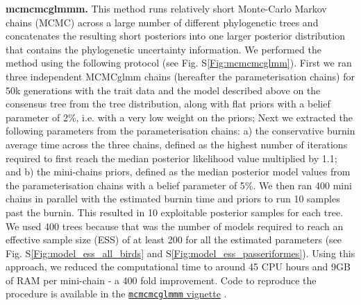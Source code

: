 \documentclass[12pt,letterpaper]{article}
\begin{document}
\textbf{mcmcmcglmmm.}
This method runs relatively short Monte-Carlo Markov chains (MCMC) across a large number of different phylogenetic trees and concatenates the resulting short posteriors into one larger posterior distribution that contains the phylogenetic uncertainty information.
We performed the method using the following protocol (see Fig. S\ref{Fig:mcmcmcglmm}).
First we ran three independent MCMCglmm chains (hereafter the parameterisation chains) for 50k generations with the trait data and the model described above on the consensus tree from the tree distribution, along with flat priors with a belief parameter of 2\%, i.e. with a very low weight on the priors;
Next we extracted the following parameters from the parameterisation chains:
a) the conservative burnin average time across the three chains, defined as the highest number of iterations required to first reach the median posterior likelihood value multiplied by 1.1; and
b) the mini-chains priors, defined as the median posterior model values from the parameterisation chains with a belief parameter of 5\%.
We then ran 400 mini chains in parallel with the estimated burnin time and priors to run 10 samples past the burnin.
This resulted in 10 exploitable posterior samples for each tree.
We used 400 trees because that was the number of models required to reach an effective sample size (ESS) of at least 200 for all the estimated parameters (see Fig. S\ref{Fig:model_ess_all_birds} and S\ref{Fig:model_ess_passeriformes}).
Using this approach, we reduced the computational time to around 45 CPU hours and 9GB of RAM per mini-chain - a 400 fold improvement.
Code to reproduce the procedure is available in the \href{https://raw.rawgit.net/TGuillerme/mcmcmcglmmm/main/inst/MCMCglmm_mini_chains.html}{\texttt{mcmcmcglmmm} vignette} \cite{mcmcmcglmmm}.
\end{document}
